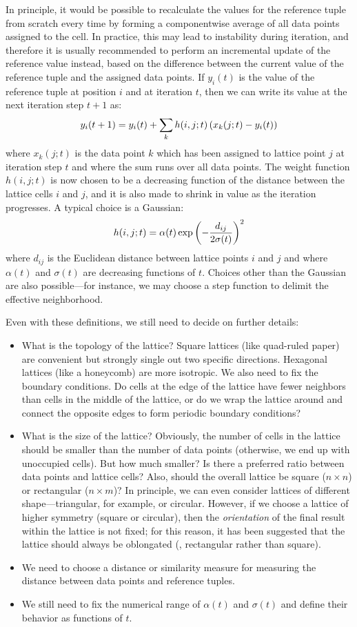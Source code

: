 In principle, it would be possible to recalculate the values for the
reference tuple from scratch every time by forming a componentwise
average of all data points assigned to the cell. In practice, this may
lead to instability during iteration, and therefore it is usually
recommended to perform an incremental update of the reference value
instead, based on the difference between the current value of the
reference tuple and the assigned data points. If $y_i(t)$ is the value
of the reference tuple at position $i$ and at iteration $t$, then we
can write its value at the next iteration step $t+1$ as:
%
\[
y_i(t+1) = y_i(t) + \sum_k h(i, j; t) \left(  x_k(j;t) - y_i(t)  \right)
\]
%
where $x_k(j;t)$ is the data point $k$ which has been assigned to
lattice point $j$ at iteration step $t$ and where the sum runs over
all data points. The weight function $h(i, j; t)$ is now chosen to be
a decreasing function of the distance between the lattice cells $i$
and $j$, and it is also made to shrink in value as the iteration
progresses.  A typical choice is a Gaussian:
%
\[
h(i, j; t) = \alpha(t) \exp \left(  - \frac{ d_{ij} }{2 \sigma(t) }  \right)^2
\]
%
where $d_{ij}$ is the Euclidean distance between lattice points $i$
and $j$ and where $\alpha(t)$ and $\sigma(t)$ are decreasing functions
of $t$.  Choices other than the Gaussian are also possible---for
instance, we may choose a step function to delimit the effective
neighborhood.

Even with these definitions, we still need to decide on further
details:

\begin{itemize}
\item What is the topology of the lattice? Square lattices (like
  quad-ruled paper) are convenient but strongly single out two
  specific directions. Hexagonal lattices (like a honeycomb) are more
  isotropic. We also need to fix the boundary conditions. Do cells at
  the edge of the lattice have fewer neighbors than cells in the
  middle of the lattice, or do we wrap the lattice around and connect
  the opposite edges to form periodic boundary conditions?
\item What is the size of the lattice? Obviously, the number of cells
  in the lattice should be smaller than the number of data points
  (otherwise, we end up with unoccupied cells). But how much smaller?
  Is there a preferred ratio between data points and lattice cells?
  Also, should the overall lattice be square ($n \times n$) or
  rectangular ($n \times m$)? In principle, we can even consider
  lattices of different shape---triangular, for example, or circular.
  However, if we choose a lattice of higher symmetry (square or
  circular), then the \emph{orientation} of the final result within
  the lattice is not fixed; for this reason, it has been suggested
  that the lattice should always be oblongated (\eg, rectangular
  rather than square).
\item We need to choose a distance or similarity measure for measuring
  the distance between data points and reference tuples.
\item We still need to fix the numerical range of $\alpha(t)$ and
  $\sigma(t)$ and define their behavior as functions of $t$.
\end{itemize}

